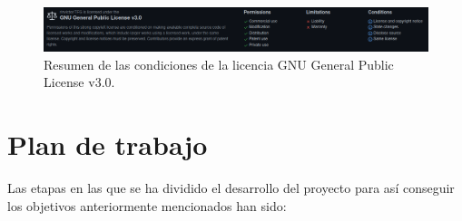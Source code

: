 \documentclass[a4paper, 12pt, oneside]{book}
\begin{document}
\begin{figure}[H]
	\centering
    \includegraphics[width=15cm, keepaspectratio]{img/license}
    \caption{Resumen de las condiciones de la licencia GNU General Public License v3.0.}
    \label{figura:license}
\end{figure}

\section{Plan de trabajo}
\label{plan de trabajo}
Las etapas en las que se ha dividido el desarrollo del proyecto para así conseguir los objetivos anteriormente mencionados han sido:
\end{document}
